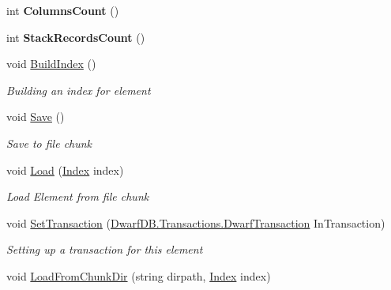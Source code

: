 \begin{DoxyCompactItemize}
\item 
\hypertarget{class_dwarf_d_b_1_1_data_structures_1_1_data_container_ac9a1a5d317146e5fdc6e0b5068495670}{int {\bfseries Columns\+Count} ()}\label{class_dwarf_d_b_1_1_data_structures_1_1_data_container_ac9a1a5d317146e5fdc6e0b5068495670}

\item 
\hypertarget{class_dwarf_d_b_1_1_data_structures_1_1_data_container_a5b1d05dc2b2b1a56c14bf3fecd26d4f0}{int {\bfseries Stack\+Records\+Count} ()}\label{class_dwarf_d_b_1_1_data_structures_1_1_data_container_a5b1d05dc2b2b1a56c14bf3fecd26d4f0}

\item 
void \hyperlink{class_dwarf_d_b_1_1_data_structures_1_1_data_container_a8f32eb712d14d6dbf42a95098673dd19}{Build\+Index} ()
\begin{DoxyCompactList}\small\item\em Building an index for element \end{DoxyCompactList}\item 
void \hyperlink{class_dwarf_d_b_1_1_data_structures_1_1_data_container_a3ca82caee7d6f38c74dbb4e2a637aecb}{Save} ()
\begin{DoxyCompactList}\small\item\em Save to file chunk \end{DoxyCompactList}\item 
void \hyperlink{class_dwarf_d_b_1_1_data_structures_1_1_data_container_ab045853ddb62b681d2474d7e547186de}{Load} (\hyperlink{class_dwarf_d_b_1_1_data_structures_1_1_index}{Index} index)
\begin{DoxyCompactList}\small\item\em Load Element from file chunk \end{DoxyCompactList}\item 
void \hyperlink{class_dwarf_d_b_1_1_data_structures_1_1_data_container_a40b2dc31b54b0d41b29e58ea5ea4a3fb}{Set\+Transaction} (\hyperlink{class_dwarf_d_b_1_1_transactions_1_1_dwarf_transaction}{Dwarf\+D\+B.\+Transactions.\+Dwarf\+Transaction} In\+Transaction)
\begin{DoxyCompactList}\small\item\em Setting up a transaction for this element \end{DoxyCompactList}\item 
void \hyperlink{class_dwarf_d_b_1_1_data_structures_1_1_data_container_a0a82f79c53628134d16f2fa21db221bf}{Load\+From\+Chunk\+Dir} (string dirpath, \hyperlink{class_dwarf_d_b_1_1_data_structures_1_1_index}{Index} index)

\end{DoxyCompactItemize}
